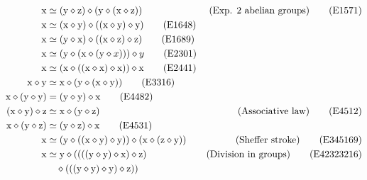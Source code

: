 \begin{align}
        \x &\formaleq (\y \op \z) \op (\y \op (\x \op \z)) & \hbox{(Exp. $2$ abelian groups)} \label{eq1571}\tag{E1571} \\
        \x &\formaleq (\x \op \y) \op ((\x \op \y) \op \y) \label{eq1648}\tag{E1648} \\
        \x &\formaleq (\y \op \x) \op ((\x \op \z) \op \z) \label{eq1689}\tag{E1689} \\
        \x &\formaleq (\y \op (\x \op (\y \op x))) \op y \label{eq2301}\tag{E2301} \\
        \x &\formaleq (\x \op ((\x \op \x) \op \x)) \op \x \label{eq2441}\tag{E2441} \\
        \x \op \y &\formaleq \x \op (\y \op (\x \op \y)) \label{eq3316}\tag{E3316} \\
        \x \op (\y \op \y) &= (\y \op \y) \op \x \label{eq4482}\tag{E4482} \\
        (\x \op \y) \op \z &\formaleq \x \op (\y \op \z) &\hbox{(Associative law)} \label{eq4512}\tag{E4512}\\
        \x \op (\y \op \z) &\formaleq (\y \op \z) \op \x \label{eq4531}\tag{E4531} \\
        \x &\formaleq (\y \op ((\x \op \y) \op \y)) \op (\x \op (\z \op \y)) & \hbox{(Sheffer stroke)} \label{eq345169}\tag{E345169} \\
        \x &\formaleq \y \op ((((\y \op \y) \op \x) \op \z) & \hbox{(Division in groups)} \label{eq42323216}\tag{E42323216} \\
        & \quad  \op (((\y \op \y) \op \y) \op \z)) \nonumber
\end{align}
